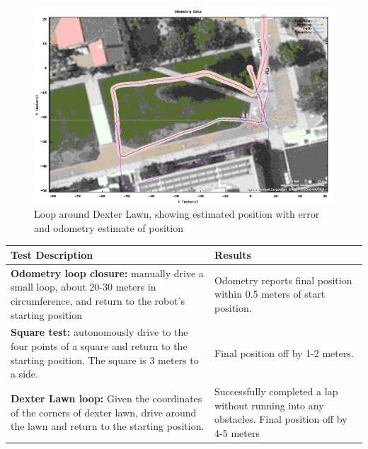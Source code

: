 \begin{figure}
\includegraphics[width=1\textwidth]{dexter-final}
\caption{Loop around Dexter Lawn, showing estimated position with error and odometry estimate of position}
\end{figure}


\begin{tabular}{ | p{} | p{} | }
        \hline
        \textbf{Test Description} & \textbf{Results} \\
           \hline
           \textbf{Odometry loop closure:} manually drive a small loop, about 20-30 meters in circumference, and return to the robot's starting position & Odometry reports final position within 0.5 meters of start position. \\
              \hline
\textbf{Square test:} autonomously drive to the four points of a square and return to the starting position. The square is 3 meters to a side. & Final position off by 1-2 meters. \\
       \hline
\textbf{Dexter Lawn loop:} Given the coordinates of the corners of dexter lawn, drive around the lawn and return to the starting position. & Successfully completed a lap without running into any obstacles. Final position off by 4-5 meters \\
       \hline
\end{tabular}
